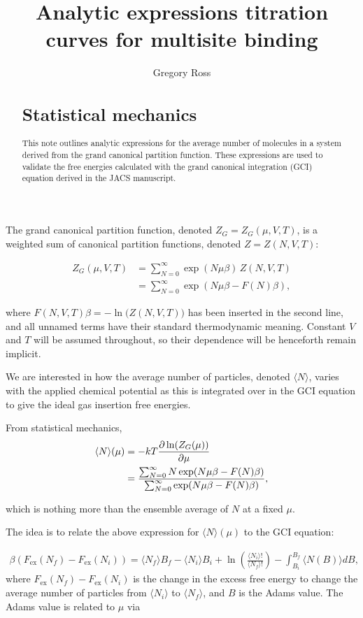\documentclass[10pt,a4paper]{article}
\author{Gregory Ross}
\title{Analytic expressions titration curves for multisite binding  }
\begin{document}
\maketitle
\begin{abstract}

\section{Statistical mechanics}
This note outlines analytic expressions for the average number of molecules in a system derived from the grand canonical partition function. These expressions are used to validate the free energies calculated with the grand canonical integration (GCI) equation derived in the JACS manuscript. 
\end{abstract}

The grand canonical partition function, denoted $Z_G = Z_G(\mu,V,T)$, is a weighted sum of canonical partition functions, denoted $Z = Z(N,V,T)$:

\begin{align}
Z_G(\mu,V,T) &= \sum_{N=0}^\infty \exp(N\mu\beta) \, Z(N,V,T) \\
&= \sum_{N=0}^\infty \exp(N\mu\beta - F(N)\beta),
\end{align}

where $F(N,V,T)\beta = -\ln\big(Z(N,V,T)\big)$ has been inserted in the second line, and all unnamed terms have their standard thermodynamic meaning. Constant $V$ and $T$ will be assumed throughout, so their dependence will be henceforth remain implicit.

We are interested in how the average number of particles, denoted $\langle N \rangle$, varies with the applied chemical potential as this is integrated over in the GCI equation to give the ideal gas insertion free energies.  

From statistical mechanics, 
\begin{align}
\langle N \rangle(\mu) &= -kT\frac{\partial\ln(Z_G(\mu))}{\partial\mu} \notag\\
&= \frac{\sum_{N=0}^\infty N\exp(N\mu\beta - F(N)\beta)}{\sum_{N=0}^\infty \exp(N\mu\beta - F(N)\beta)},
\label{eq:aveN}
\end{align}

which is nothing more than the ensemble average of $N$ at a fixed $\mu$.

The idea is to relate the above expression for $\langle N \rangle(\mu)$ to the GCI equation:

\begin{align}
 \beta(F_\text{ex}(N_f) - F_\text{ex}(N_i))  =  \langle N_f \rangle B_f -  \langle N_i\rangle B_i + \ln \left(\frac{\langle N_i \rangle !}{ \langle N_f\rangle !}\right) - \int_{B_i}^{B_f}  \langle N(B) \rangle d B, 
 \label{eq:gci}
\end{align}
where $F_\text{ex}(N_f) - F_\text{ex}(N_i)$ is the change in the excess free energy to change the average number of particles from $\langle N_i \rangle$ to  $\langle N_f \rangle$, and $B$ is the Adams value. The Adams value is related to $\mu$ via
\end{document}

